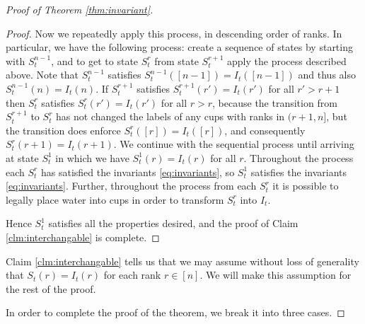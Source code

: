 \documentclass[twocolumn]{article}[10pt]
\begin{document}
\begin{proof}[Proof of Theorem \ref{thm:invariant}]
\begin{proof}
Now we repeatedly apply this process, in descending order of ranks. 
In particular, we have the following process: create a sequence of states by
starting with $S_t^{n-1}$, and to get to state $S_t^{r}$ from state $S_t^{r+1}$
apply the process described above. 
Note that $S_t^{n-1}$ satisfies $S_t^{n-1}([n-1]) = I_t([n-1])$ and thus also
$S_t^{n-1}(n) = I_t(n)$.
If $S_t^{r+1}$ satisfies $S_t^{r+1}(r') = I_t(r')$ for all $r'>r+1$ then
$S_t^r$ satisfies $S_t^r(r') = I_t(r')$ for all $r > r$, because the transition
from $S_t^{r+1}$ to $S_t^r$ has not changed the labels of any cups with ranks
in $(r+1, n]$, but the transition does enforce $S_t^r([r]) = I_t([r])$, and
consequently $S_t^r(r+1) = I_t(r+1)$.
We continue with the sequential process until arriving at state $S_t^1$ in
which we have $S_t^1(r) = I_t(r)$ for all $r$.
Throughout the process each $S_t^r$ has satisfied the invariants
\eqref{eq:invariants}, so $S_t^1$ satisfies the invariants
\eqref{eq:invariants}. Further, throughout the process from each $S_t^r$ it is
possible to legally place water into cups in order to transform $S_t^r$ into
$I_t$.

Hence $S_t^1$ satisfies all the properties desired, and the proof of Claim
\ref{clm:interchangable} is complete.

\end{proof}

Claim \ref{clm:interchangable} tells us that we may assume without loss of
generality that $S_t(r) = I_t(r)$ for each rank $r \in [n]$. We will make
this assumption for the rest of the proof. 

In order to complete the proof of the theorem, we break it into three cases. 


\end{proof}
\end{document}
